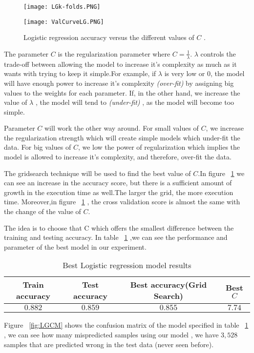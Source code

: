 \documentclass{article}
\begin{document}
\begin{figure}[H]
	\centering
	\begin{minipage}{0.45\textwidth}
			\centering
		\texttt{[image: LGk-folds.PNG]}\caption{{\small The accuracy of logistic regression model with 4-folds cross validation (C=1) .}}
		\label{fig:LGk-folds}
	\end{minipage}\hfill
	\begin{minipage}{0.45\textwidth}
		\centering
	\texttt{[image: ValCurveLG.PNG]}\caption{{\small Logistic regression accuracy versus the different values of $C$ . }}
	\label{fig:LGk-ValCurveLG}
	\end{minipage}
\end{figure}

The parameter $C$ is the regularization parameter where $C = \frac{1}{\lambda}$. 
$\lambda$ controls the trade-off between allowing the model to increase it's complexity as much as it wants with trying to keep it simple.For example, if $\lambda$ is very low or 0, the model will have enough power to increase it's complexity \textit{(over-fit)} by assigning big values to the weights for each parameter. If, in the other hand, we increase the value of  $\lambda$ , the model will tend to \textit{(under-fit)} , as the model will become too simple.

Parameter $C$ will work the other way around. For small values of $C$, we increase the regularization strength which will create simple models which under-fit the data. For big values of $C$, we low the power of regularization which implies the model is allowed to increase it's complexity, and therefore, over-fit the data.

The gridsearch technique will be used to find the best value of $C$.In figure ~\ref {fig:LGk-ValCurveLG} we can see an increase in the accuracy score, but there is a sufficient amount of growth in the execution time as well.The larger the grid, the more execution time.
Moreover,in figure ~\ref {fig:LGk-ValCurveLG} , the cross validation score is almost the same with the change of the value of $C$.

The idea is to choose that C which offers the smallest difference between the training and testing accuracy. In table ~\ref{table:1} ,we can see the performance and  parameter of the best model in our experiment.

\begin{table}[H]
	\centering
	\begin{tabular}{|c| c| c| c|} 
		\hline
		Train accuracy & Test accuracy & Best accuracy(Grid Search)  & Best $C$ \\ 
		\hline\hline
		$0.882$ & $ 0.859$ & $0.855$ & $7.74$  \\ 
		\hline
	\end{tabular}
	\caption{{\small Best Logistic regression model results}}
	\label{table:1}
\end{table} 
Figure ~\ref {fig:LGCM} shows the confusion matrix of the model specified in table ~\ref{table:1} , we can see how many mispredicted samples using our model , we have $3,528$ samples that are predicted wrong in the test data (never seen before).
\end{document}
